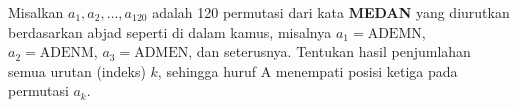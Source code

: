 Misalkan $a_1, a_2, \dots, a_{120}$ adalah 120 permutasi dari kata \textbf{MEDAN} yang diurutkan berdasarkan abjad seperti di dalam kamus, misalnya $a_1=\text{ADEMN}$, $a_2=\text{ADENM}$, $a_3=\text{ADMEN}$, dan seterusnya. 
Tentukan hasil penjumlahan semua urutan (indeks) $k$, sehingga huruf A menempati posisi ketiga pada permutasi $a_k$.